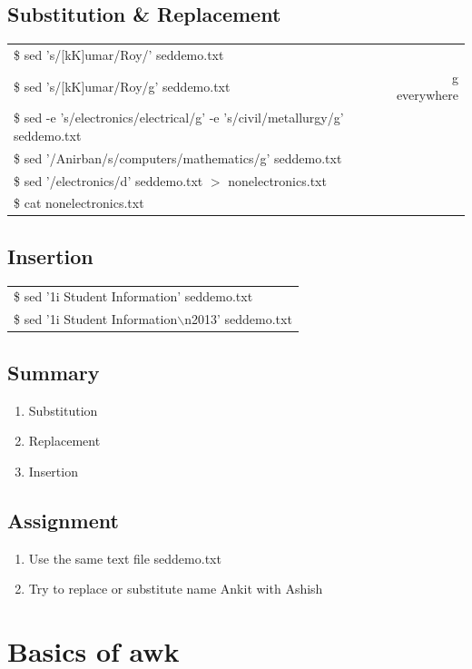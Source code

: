 \documentclass[12pt, a4paper]{report}
\begin{document}
\section{Substitution \& Replacement}
\begin{tabular}{|lcr|}\hline
\$ sed 's/[kK]umar/Roy/' seddemo.txt && \\
\$ sed 's/[kK]umar/Roy/g' seddemo.txt	 &&  g everywhere\\
\$ sed -e 's/electronics/electrical/g' -e 's/civil/metallurgy/g' seddemo.txt && \\
\$ sed '/Anirban/s/computers/mathematics/g' seddemo.txt && \\
\$ sed '/electronics/d' seddemo.txt $>$ nonelectronics.txt && \\
\$ cat nonelectronics.txt && \\ \hline
\end{tabular}
\section{Insertion}
\begin{tabular}{|l|}\hline
\$ sed '1i Student Information' seddemo.txt\\
\$ sed '1i Student Information$\backslash$n2013' seddemo.txt\\ \hline
\end{tabular}
\section{Summary}
\begin{enumerate}
\item Substitution
\item Replacement
\item Insertion
\end{enumerate}
\section{Assignment}
\begin{enumerate}
\item Use the same text file seddemo.txt
\item Try to replace or substitute name Ankit with Ashish
\end{enumerate}
\chapter{Basics of awk}
\end{document}
